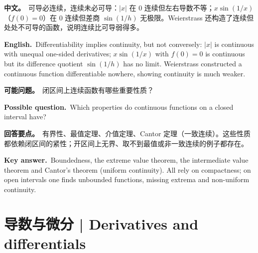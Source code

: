 \documentclass[UTF8,11pt,a4paper]{ctexart}
\newcommand{\BOTH}[2]{\par\noindent\textbf{中文。}\ #1\par\noindent\textbf{English.}\ #2\par}
\newcommand{\ASK}[4]{\begin{samepage}\par\noindent\textbf{可能问题。}\ #1\par\noindent\textbf{Possible question.}\ #2\par\noindent\textbf{回答要点。}\ #3\par\noindent\textbf{Key answer.}\ #4\medskip\end{samepage}}
\begin{document}
\BOTH{可导必连续，连续未必可导：$|x|$ 在 $0$ 连续但左右导数不等；$x\sin(1/x)$（$f(0)=0$）在 $0$ 连续但差商 $\sin(1/h)$ 无极限。Weierstrass 还构造了连续但处处不可导的函数，说明连续比可导弱得多。}{Differentiability implies continuity, but not conversely: $|x|$ is continuous with unequal one-sided derivatives; $x\sin(1/x)$ with $f(0)=0$ is continuous but its difference quotient $\sin(1/h)$ has no limit. Weierstrass constructed a continuous function differentiable nowhere, showing continuity is much weaker.}
\ASK{闭区间上连续函数有哪些重要性质？}{Which properties do continuous functions on a closed interval have?}{有界性、最值定理、介值定理、Cantor 定理（一致连续）。这些性质都依赖闭区间的紧性；开区间上无界、取不到最值或非一致连续的例子都存在。}{Boundedness, the extreme value theorem, the intermediate value theorem and Cantor's theorem (uniform continuity). All rely on compactness; on open intervals one finds unbounded functions, missing extrema and non-uniform continuity.}

\section{导数与微分 | Derivatives and differentials}
\end{document}
